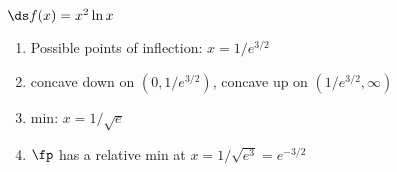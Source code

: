 {$\ds f(x) = x^2\ln x$
}
{\begin{enumerate}[label=(\alph*)]
\item Possible points of inflection: $x=1/e^{3/2}$
\item concave down on $(0,1/e^{3/2})$,
concave up on $(1/e^{3/2},\infty)$
\item min: $x=1/\sqrt{e}$
\item $\fp$ has a relative min at $x= 1/\sqrt{e^3}=e^{-3/2}$
\end{enumerate}}
